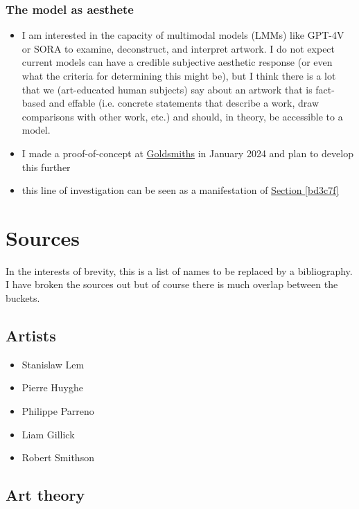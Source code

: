 \documentclass{article}
\begin{document}
\subsubsection{The model as aesthete}

\label{0aa37d}

\begin{itemize}
\item I am interested in the capacity of multimodal models (LMMs) like GPT-4V or SORA to examine, deconstruct, and interpret artwork.  I do not expect current models can have a credible subjective aesthetic response (or even what the criteria for determining this might be), but I think there is a lot that we (art-educated human subjects) say about an artwork that is fact-based and effable (i.e. concrete statements that describe a work, draw comparisons with other work, etc.) and should, in theory, be accessible to a model.
\end{itemize}
\begin{itemize}
\item I made a proof-of-concept at \href{http://ukc10014.org/fixedp.html}{Goldsmiths} in January 2024 and plan to develop this further
\item this line of investigation can be seen as a manifestation of \hyperref[bd3c7f]{Section \ref*{bd3c7f}}
\end{itemize}


\section{Sources}

In the interests of brevity, this is a list of names to be replaced by a bibliography.  I have broken the sources out but of course there is much overlap between the buckets.

\subsection{Artists}
\begin{itemize}
\item Stanislaw Lem
\item Pierre Huyghe
\item Philippe Parreno
\item Liam Gillick
\item Robert Smithson
\end{itemize}

\subsection{Art theory}
\end{document}
